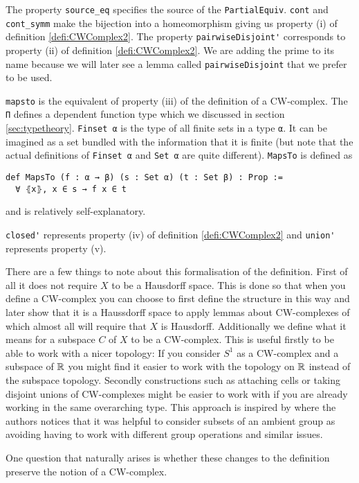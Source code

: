 The property \lstinline{source_eq} specifies the source of the \lstinline{PartialEquiv}. 
\lstinline{cont} and \lstinline{cont_symm} make the bijection into a homeomorphism giving us property (i) of definition \ref{defi:CWComplex2}.
The property \lstinline{pairwiseDisjoint'} corresponds to property (ii) of definition \ref{defi:CWComplex2}. 
We are adding the prime to its name because we will later see a lemma called \lstinline{pairwiseDisjoint} that we prefer to be used. 

\lstinline{mapsto} is the equivalent of property (iii) of the definition of a CW-complex. 
The \lstinline{Π} defines a dependent function type which we discussed in section \ref{sec:typetheory}.
\lstinline{Finset α} is the type of all finite sets in a type \lstinline{α}. 
It can be imagined as a set bundled with the information that it is finite (but note that the actual definitions of \lstinline{Finset α} and \lstinline{Set α} are quite different).
\lstinline{MapsTo} is defined as
\begin{lstlisting}
def MapsTo (f : α → β) (s : Set α) (t : Set β) : Prop := 
  ∀ ⦃x⦄, x ∈ s → f x ∈ t
\end{lstlisting}

and is relatively self-explanatory. 

\lstinline{closed'} represents property (iv) of definition \ref{defi:CWComplex2} and \lstinline{union'} represents property (v). 

\medskip

There are a few things to note about this formalisation of the definition. 
First of all it does not require $X$ to be a Hausdorff space. 
This is done so that when you define a CW-complex you can choose to first define the structure in this way and later show that it is a Haussdorff space to apply lemmas about CW-complexes of which almost all will require that $X$ is Hausdorff. 
Additionally we define what it means for a subspace $C$ of $X$ to be a CW-complex.
This is useful firstly to be able to work with a nicer topology: 
If you consider $S^1$ as a CW-complex and a subspace of $\mathbb{R}$ you might find it easier to work with the topology on $\mathbb{R}$ instead of the subspace topology. 
Secondly constructions such as attaching cells or taking disjoint unions of CW-complexes might be easier to work with if you are already working in the same overarching type.
This approach is inspired by \cite{Gonthier2013} where the authors notices that it was helpful to consider subsets of an ambient group as avoiding having to work with different group operations and similar issues. 

One question that naturally arises is whether these changes to the definition preserve the notion of a CW-complex. 
